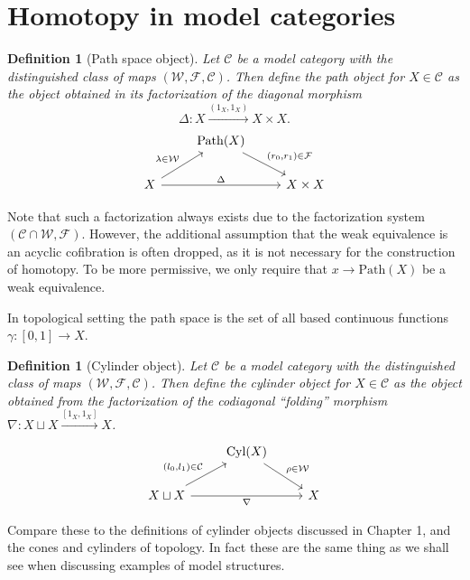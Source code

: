 \documentclass[12pt]{report}
\numberwithin{equation}{section}
\newtheorem{definition}[dummy]{Definition}
\begin{document}
	\section{Homotopy in model categories}
	
	\begin{definition}[Path space object]
		Let $\mathcal{C}$ be a model category with the distinguished class of maps $(\mathcal{W,F,C})$. Then define the path object for $X \in \mathcal{C}$ as the object obtained in its factorization of the diagonal morphism $$\Delta: X \xrightarrow{(1_X,1_X)} X \times X.$$
		\[\begin{tikzcd}
			& {\mathrm{Path}(X)} \\
			X && {X\times X}
			\arrow["{(r_0,r_1) \in \mathcal{F}}", from=1-2, to=2-3]
			\arrow["{\lambda \in \mathcal{W}}", from=2-1, to=1-2]
			\arrow["{\Delta}", from=2-1, to=2-3]
		\end{tikzcd}\]
	\end{definition}
	Note that such a factorization always exists due to the factorization system $(\mathcal{C} \cap \mathcal{W}, \mathcal{F})$. However, the additional assumption that the weak equivalence is an acyclic cofibration is often dropped, as it is not necessary for the construction of homotopy. To be more permissive, we only require that $x \to \mathrm{Path}(X)$ be a weak equivalence.
	
	In topological setting the path space is the set of all based continuous functions $\gamma:[0,1]\to X$.
	
	\begin{definition}[Cylinder object]
		Let $\mathcal{C}$ be a model category with the distinguished class of maps $(\mathcal{W,F,C})$. Then define the cylinder object for $X \in \mathcal{C}$ as the object obtained from the factorization of the codiagonal ``folding'' morphism $\nabla: X \sqcup X \xrightarrow{[1_X,1_X]} X$.
	\[\begin{tikzcd}
		& {\mathrm{Cyl}(X)} \\
		{X\sqcup X} && X
		\arrow["{\rho\in \mathcal{W}}", from=1-2, to=2-3]
		\arrow["{(l_0,l_1)\in\mathcal{C}}", from=2-1, to=1-2]
		\arrow["\nabla"', from=2-1, to=2-3]
	\end{tikzcd}\]
	\end{definition}
	
	Compare these to the definitions of cylinder objects discussed in Chapter 1, and the cones and cylinders of topology. In fact these are the same thing as we shall see when discussing examples of model structures.
	
\end{document}
